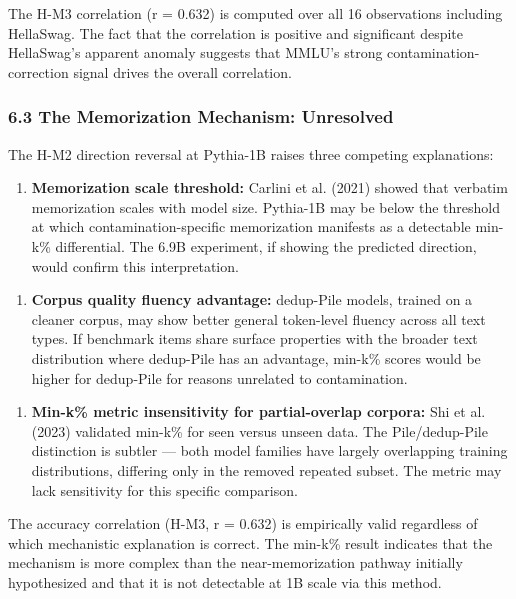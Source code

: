 The H-M3 correlation (r = 0.632) is computed over all 16 observations including HellaSwag. The fact that the correlation is positive and significant despite HellaSwag's apparent anomaly suggests that MMLU's strong contamination-correction signal drives the overall correlation.

\subsubsection{6.3 The Memorization Mechanism: Unresolved}

The H-M2 direction reversal at Pythia-1B raises three competing explanations:

\begin{enumerate}
\item \textbf{Memorization scale threshold:} Carlini et al. (2021) showed that verbatim memorization scales with model size. Pythia-1B may be below the threshold at which contamination-specific memorization manifests as a detectable min-k\% differential. The 6.9B experiment, if showing the predicted direction, would confirm this interpretation.
\end{enumerate}

\begin{enumerate}
\item \textbf{Corpus quality fluency advantage:} dedup-Pile models, trained on a cleaner corpus, may show better general token-level fluency across all text types. If benchmark items share surface properties with the broader text distribution where dedup-Pile has an advantage, min-k\% scores would be higher for dedup-Pile for reasons unrelated to contamination.
\end{enumerate}

\begin{enumerate}
\item \textbf{Min-k\% metric insensitivity for partial-overlap corpora:} Shi et al. (2023) validated min-k\% for seen versus unseen data. The Pile/dedup-Pile distinction is subtler --- both model families have largely overlapping training distributions, differing only in the removed repeated subset. The metric may lack sensitivity for this specific comparison.
\end{enumerate}

The accuracy correlation (H-M3, r = 0.632) is empirically valid regardless of which mechanistic explanation is correct. The min-k\% result indicates that the mechanism is more complex than the near-memorization pathway initially hypothesized and that it is not detectable at 1B scale via this method.

